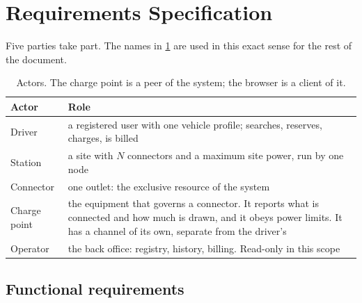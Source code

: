\section{Requirements Specification}
\label{sec:requirements}

Five parties take part. The names in \cref{tab:actors} are used in this exact sense for the
rest of the document.

\begin{table}[h]
\centering\small
\renewcommand{\arraystretch}{1.15}
\caption{Actors. The charge point is a peer of the system; the browser is a client of it.}
\label{tab:actors}
\begin{tabularx}{\textwidth}{@{}l X@{}}
\toprule
Actor & Role \\
\midrule
Driver & a registered user with one vehicle profile; searches, reserves, charges, is billed \\
Station & a site with $N$ connectors and a maximum site power, run by one node \\
Connector & one outlet: the exclusive resource of the system \\
Charge point & the equipment that governs a connector. It reports what is connected and how
  much is drawn, and it obeys power limits. It has a channel of its own, separate from the
  driver's \\
Operator & the back office: registry, history, billing. Read-only in this scope \\
\bottomrule
\end{tabularx}
\end{table}

\subsection{Functional requirements}
\label{sec:functional}

